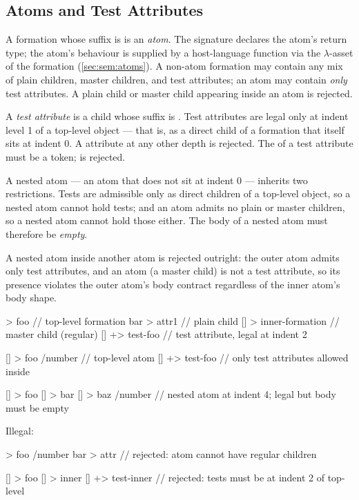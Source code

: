 \subsection{Atoms and Test Attributes}\label{sec:wf:atoms}

A formation whose suffix is  is an \emph{atom}.
The signature  declares the atom's return type;
  the atom's behaviour is supplied by a host-language function via the
  \(\lambda\)-asset of the formation (\cref{sec:sem:atoms}).
A non-atom formation may contain any mix of plain children, master children,
  and test attributes; an atom may contain \emph{only} test attributes.
A plain child or master child appearing inside an atom is rejected.

A \emph{test attribute} is a child whose suffix is .
Test attributes are legal only at indent level 1 of a top-level object ---
  that is, as a direct child of a formation that itself sits at indent 0.
A \ff{+>} attribute at any other depth is rejected.
The  of a test attribute must be a  token;
   is rejected.

A nested atom --- an atom that does not sit at indent 0 --- inherits two
  restrictions.
Tests are admissible only as direct children of a top-level object, so a
  nested atom cannot hold tests;
  and an atom admits no plain or master children, so a nested atom cannot
  hold those either.
The body of a nested atom must therefore be \emph{empty}.

A nested atom inside another atom is rejected outright:
  the outer atom admits only test attributes, and an atom (a master child)
  is not a test attribute, so its presence violates the outer atom's body
  contract regardless of the inner atom's body shape.

\begin{ffcode}
[] > foo                // top-level formation
  bar > attr1           //   plain child
  [] > inner-formation  //   master child (regular)
  [] +> test-foo        //   test attribute, legal at indent 2

[] > foo /number        // top-level atom
  [] +> test-foo        //   only test attributes allowed inside

[] > foo
  [] > bar
    [] > baz /number    // nested atom at indent 4; legal but body must be empty
\end{ffcode}

Illegal:
\begin{ffcode}
[] > foo /number
  bar > attr            // rejected: atom cannot have regular children

[] > foo
  [] > inner
    [] +> test-inner    // rejected: tests must be at indent 2 of top-level
\end{ffcode}

